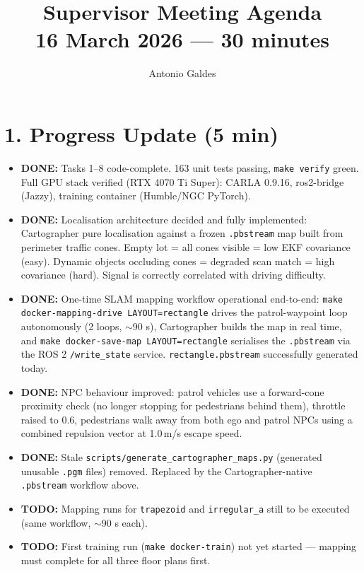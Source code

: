 \documentclass[11pt,a4paper]{article}
\title{Supervisor Meeting Agenda\\
\large 16 March 2026 --- 30 minutes}
\author{Antonio Galdes}
\date{}
\newcommand{\done}[1]{\textcolor{done}{\textbf{DONE:}} #1}
\newcommand{\todo}[1]{\textcolor{todo}{\textbf{TODO:}} #1}
\begin{document}
\maketitle

\section*{1. Progress Update (5 min)}

\begin{itemize}[leftmargin=*]
  \item \done{Tasks 1--8 code-complete. 163 unit tests passing, \texttt{make verify}
    green. Full GPU stack verified (RTX 4070 Ti Super): CARLA 0.9.16, ros2-bridge
    (Jazzy), training container (Humble/NGC PyTorch).}

  \item \done{Localisation architecture decided and fully implemented: Cartographer
    pure localisation against a frozen \texttt{.pbstream} map built from perimeter
    traffic cones. Empty lot = all cones visible = low EKF covariance (easy). Dynamic
    objects occluding cones = degraded scan match = high covariance (hard). Signal
    is correctly correlated with driving difficulty.}

  \item \done{One-time SLAM mapping workflow operational end-to-end:
    \texttt{make docker-mapping-drive LAYOUT=rectangle} drives the patrol-waypoint loop
    autonomously (2 loops, $\sim$90 s), Cartographer builds the map in real time,
    and \texttt{make docker-save-map LAYOUT=rectangle} serialises the
    \texttt{.pbstream} via the ROS 2 \texttt{/write\_state} service.
    \texttt{rectangle.pbstream} successfully generated today.}

  \item \done{NPC behaviour improved: patrol vehicles use a forward-cone proximity
    check (no longer stopping for pedestrians behind them), throttle raised to 0.6,
    pedestrians walk away from both ego and patrol NPCs using a combined repulsion
    vector at 1.0\,m/s escape speed.}

  \item \done{Stale \texttt{scripts/generate\_cartographer\_maps.py} (generated
    unusable \texttt{.pgm} files) removed. Replaced by the Cartographer-native
    \texttt{.pbstream} workflow above.}

  \item \todo{Mapping runs for \texttt{trapezoid} and \texttt{irregular\_a} still
    to be executed (same workflow, $\sim$90 s each).}

  \item \todo{First training run (\texttt{make docker-train}) not yet started ---
    mapping must complete for all three floor plans first.}
\end{itemize}
\end{document}

